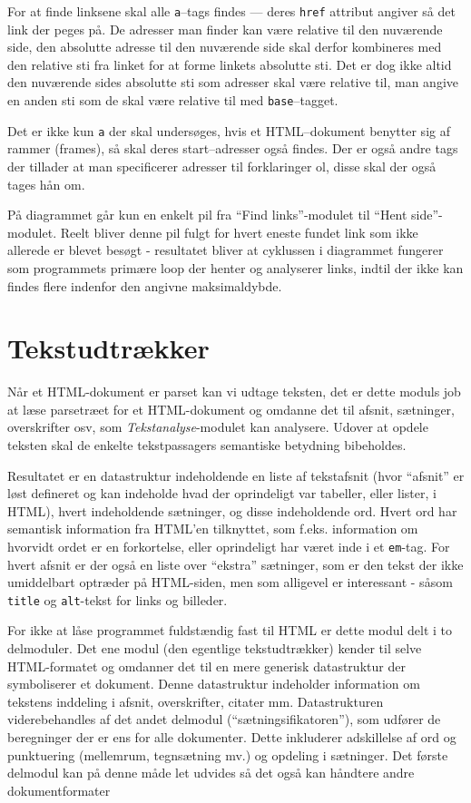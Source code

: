 \documentclass[a4paper,oneside,article, titlepage]{memoir}
\begin{document}
For at finde linksene skal alle \texttt{a}--tags findes --- deres
\texttt{href} attribut angiver så det link der peges på. De adresser
man finder kan være relative til den nuværende side, den absolutte
adresse til den nuværende side skal derfor kombineres med den relative
sti fra linket for at forme linkets absolutte sti. Det er dog ikke
altid den nuværende sides absolutte sti som adresser skal være
relative til, man angive en anden sti som de skal være relative til
med \texttt{base}--tagget. 

Det er ikke kun \texttt{a} der skal undersøges, hvis et HTML--dokument
benytter sig af rammer (frames), så skal deres start--adresser også
findes. Der er også andre tags der tillader at man specificerer
adresser til forklaringer ol, disse skal der også tages hån om.

På diagrammet går kun en enkelt pil fra ``Find links''-modulet til
``Hent side''-modulet. Reelt bliver denne pil fulgt for hvert eneste
fundet link som ikke allerede er blevet besøgt - resultatet bliver at
cyklussen i diagrammet fungerer som programmets primære loop der
henter og analyserer links, indtil der ikke kan findes flere indenfor
den angivne maksimaldybde.

\section{Tekstudtrækker}
Når et HTML-dokument er parset kan vi udtage teksten, det er dette
moduls job at læse parsetræet for et HTML-dokument og omdanne det til
afsnit, sætninger, overskrifter osv, som \textit{Tekstanalyse}-modulet
kan analysere. Udover at opdele teksten skal de enkelte tekstpassagers
semantiske betydning bibeholdes.

Resultatet er en datastruktur indeholdende en liste af tekstafsnit
(hvor ``afsnit'' er løst defineret og kan indeholde hvad der
oprindeligt var tabeller, eller lister, i HTML), hvert indeholdende
sætninger, og disse indeholdende ord. Hvert ord har semantisk
information fra HTML'en tilknyttet, som f.eks. information om hvorvidt
ordet er en forkortelse, eller oprindeligt har været inde i et
\texttt{em}-tag. For hvert afsnit er der også en liste over ``ekstra''
sætninger, som er den tekst der ikke umiddelbart optræder på
HTML-siden, men som alligevel er interessant - såsom \texttt{title} og
\texttt{alt}-tekst for links og billeder.

For ikke at låse programmet fuldstændig fast til HTML er dette modul
delt i to delmoduler. Det ene modul (den egentlige tekstudtrækker)
kender til selve HTML-formatet og omdanner det til en mere generisk
datastruktur der symboliserer et dokument. Denne datastruktur
indeholder information om tekstens inddeling i afsnit, overskrifter,
citater mm. Datastrukturen viderebehandles af det andet delmodul
(``sætningsifikatoren''), som udfører de beregninger der er ens for
alle dokumenter. Dette inkluderer adskillelse af ord og punktuering
(mellemrum, tegnsætning mv.) og opdeling i sætninger.  Det første
delmodul kan på denne måde let udvides så det også kan håndtere andre
dokumentformater
\end{document}
